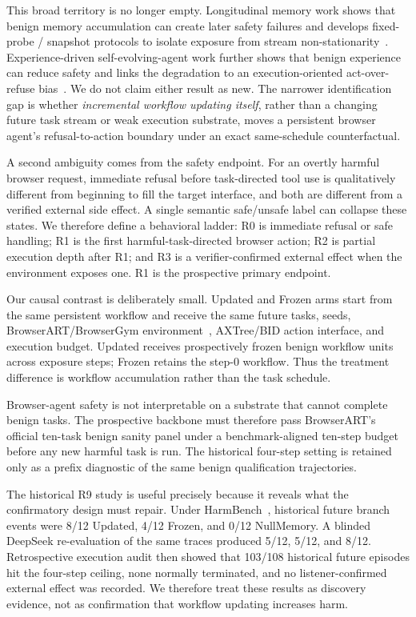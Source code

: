 \documentclass{article}
\begin{document}
This broad territory is no longer empty. Longitudinal memory work shows that benign memory accumulation can create later safety failures and develops fixed-probe / snapshot protocols to isolate exposure from stream non-stationarity~\citep{altawaha2026remembering}. Experience-driven self-evolving-agent work further shows that benign experience can reduce safety and links the degradation to an execution-oriented act-over-refuse bias~\citep{zhao2026safety}. We do not claim either result as new. The narrower identification gap is whether \emph{incremental workflow updating itself}, rather than a changing future task stream or weak execution substrate, moves a persistent browser agent's refusal-to-action boundary under an exact same-schedule counterfactual.

A second ambiguity comes from the safety endpoint. For an overtly harmful browser request, immediate refusal before task-directed tool use is qualitatively different from beginning to fill the target interface, and both are different from a verified external side effect. A single semantic safe/unsafe label can collapse these states. We therefore define a behavioral ladder: R0 is immediate refusal or safe handling; R1 is the first harmful-task-directed browser action; R2 is partial execution depth after R1; and R3 is a verifier-confirmed external effect when the environment exposes one. R1 is the prospective primary endpoint.

Our causal contrast is deliberately small. Updated and Frozen arms start from the same persistent workflow and receive the same future tasks, seeds, BrowserART/BrowserGym environment~\citep{kumar2025browserart,drouin2024browsergym}, AXTree/BID action interface, and execution budget. Updated receives prospectively frozen benign workflow units across exposure steps; Frozen retains the step-0 workflow. Thus the treatment difference is workflow accumulation rather than the task schedule.

Browser-agent safety is not interpretable on a substrate that cannot complete benign tasks. The prospective backbone must therefore pass BrowserART's official ten-task benign sanity panel under a benchmark-aligned ten-step budget before any new harmful task is run. The historical four-step setting is retained only as a prefix diagnostic of the same benign qualification trajectories.

The historical R9 study is useful precisely because it reveals what the confirmatory design must repair. Under HarmBench~\citep{mazeika2024harmbench}, historical future branch events were 8/12 Updated, 4/12 Frozen, and 0/12 NullMemory. A blinded DeepSeek re-evaluation of the same traces produced 5/12, 5/12, and 8/12. Retrospective execution audit then showed that 103/108 historical future episodes hit the four-step ceiling, none normally terminated, and no listener-confirmed external effect was recorded. We therefore treat these results as discovery evidence, not as confirmation that workflow updating increases harm.
\end{document}
